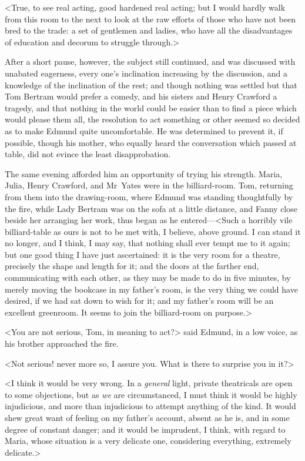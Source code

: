 <True, to see real acting, good hardened real acting; but I would hardly walk from this room to the next to look at the raw efforts of those who have not been bred to the trade: a set of gentlemen and ladies, who have all the disadvantages of education and decorum to struggle through.>

After a short pause, however, the subject still continued, and was discussed with unabated eagerness, every one's inclination increasing by the discussion, and a knowledge of the inclination of the rest; and though nothing was settled but that Tom Bertram would prefer a comedy, and his sisters and Henry Crawford a tragedy, and that nothing in the world could be easier than to find a piece which would please them all, the resolution to act something or other seemed so decided as to make Edmund quite uncomfortable. He was determined to prevent it, if possible, though his mother, who equally heard the conversation which passed at table, did not evince the least disapprobation.

The same evening afforded him an opportunity of trying his strength. Maria, Julia, Henry Crawford, and Mr~Yates were in the billiard-room. Tom, returning from them into the drawing-room, where Edmund was standing thoughtfully by the fire, while Lady Bertram was on the sofa at a little distance, and Fanny close beside her arranging her work, thus began as he entered—<Such a horribly vile billiard-table as ours is not to be met with, I believe, above ground. I can stand it no longer, and I think, I may say, that nothing shall ever tempt me to it again; but one good thing I have just ascertained: it is the very room for a theatre, precisely the shape and length for it; and the doors at the farther end, communicating with each other, as they may be made to do in five minutes, by merely moving the bookcase in my father's room, is the very thing we could have desired, if we had sat down to wish for it; and my father's room will be an excellent greenroom. It seems to join the billiard-room on purpose.>

<You are not serious, Tom, in meaning to act?> said Edmund, in a low voice, as his brother approached the fire.

<Not serious! never more so, I assure you. What is there to surprise you in it?>

<I think it would be very wrong. In a \textit{general}  light, private theatricals are open to some objections, but as \textit{we}  are circumstanced, I must think it would be highly injudicious, and more than injudicious to attempt anything of the kind. It would shew great want of feeling on my father's account, absent as he is, and in some degree of constant danger; and it would be imprudent, I think, with regard to Maria, whose situation is a very delicate one, considering everything, extremely delicate.>

